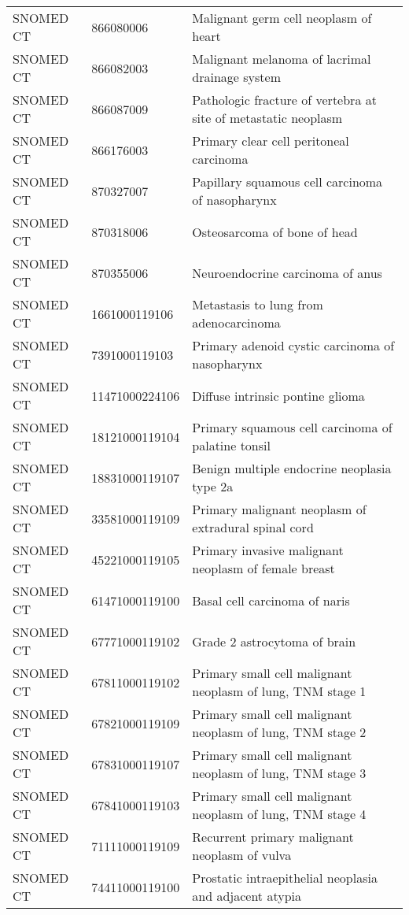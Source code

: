 \begin{longtable}{p{}p{}p{}}
  SNOMED CT & 866080006 & Malignant germ cell neoplasm of heart \\ 
  SNOMED CT & 866082003 & Malignant melanoma of lacrimal drainage system \\ 
  SNOMED CT & 866087009 & Pathologic fracture of vertebra at site of metastatic neoplasm \\ 
  SNOMED CT & 866176003 & Primary clear cell peritoneal carcinoma \\ 
  SNOMED CT & 870327007 & Papillary squamous cell carcinoma of nasopharynx \\ 
  SNOMED CT & 870318006 & Osteosarcoma of bone of head \\ 
  SNOMED CT & 870355006 & Neuroendocrine carcinoma of anus \\ 
  SNOMED CT & 1661000119106 & Metastasis to lung from adenocarcinoma \\ 
  SNOMED CT & 7391000119103 & Primary adenoid cystic carcinoma of nasopharynx \\ 
  SNOMED CT & 11471000224106 & Diffuse intrinsic pontine glioma \\ 
  SNOMED CT & 18121000119104 & Primary squamous cell carcinoma of palatine tonsil \\ 
  SNOMED CT & 18831000119107 & Benign multiple endocrine neoplasia type 2a \\ 
  SNOMED CT & 33581000119109 & Primary malignant neoplasm of extradural spinal cord \\ 
  SNOMED CT & 45221000119105 & Primary invasive malignant neoplasm of female breast \\ 
  SNOMED CT & 61471000119100 & Basal cell carcinoma of naris \\ 
  SNOMED CT & 67771000119102 & Grade 2 astrocytoma of brain \\ 
  SNOMED CT & 67811000119102 & Primary small cell malignant neoplasm of lung, TNM stage 1 \\ 
  SNOMED CT & 67821000119109 & Primary small cell malignant neoplasm of lung, TNM stage 2 \\ 
  SNOMED CT & 67831000119107 & Primary small cell malignant neoplasm of lung, TNM stage 3 \\ 
  SNOMED CT & 67841000119103 & Primary small cell malignant neoplasm of lung, TNM stage 4 \\ 
  SNOMED CT & 71111000119109 & Recurrent primary malignant neoplasm of vulva \\ 
  SNOMED CT & 74411000119100 & Prostatic intraepithelial neoplasia and adjacent atypia \\ 

\end{longtable}
